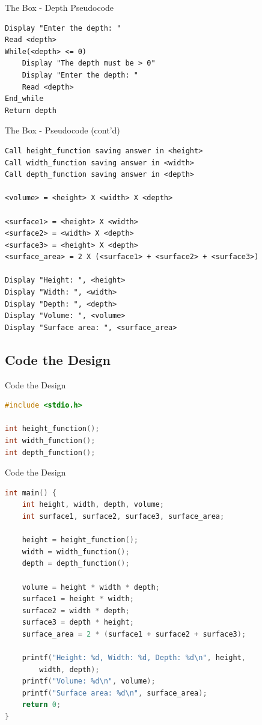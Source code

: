 \documentclass[graphics]{beamer}
\begin{document}
\begin{frame}[fragile]{The Box - Depth Pseudocode}
    \begin{verbatim}
Display "Enter the depth: "
Read <depth>
While(<depth> <= 0)
    Display "The depth must be > 0"
    Display "Enter the depth: "
    Read <depth>
End_while
Return depth
    \end{verbatim}
\end{frame}

\begin{frame}[fragile]{The Box - Pseudocode (cont'd)}
    \begin{verbatim}
Call height_function saving answer in <height>
Call width_function saving answer in <width>
Call depth_function saving answer in <depth>

<volume> = <height> X <width> X <depth>

<surface1> = <height> X <width>
<surface2> = <width> X <depth>
<surface3> = <height> X <depth>
<surface_area> = 2 X (<surface1> + <surface2> + <surface3>)

Display "Height: ", <height>
Display "Width: ", <width>
Display "Depth: ", <depth>
Display "Volume: ", <volume>
Display "Surface area: ", <surface_area>
    \end{verbatim}
\end{frame}

\subsection{Code the Design}
\begin{frame}[fragile]{Code the Design}
    \begin{lstlisting}[language=C,basicstyle=\footnotesize,keywordstyle=\color{blue},commentstyle=\color{green},showstringspaces=false,stringstyle=\color{red}]
#include <stdio.h>

int height_function();
int width_function();
int depth_function();
    \end{lstlisting}
\end{frame}

\begin{frame}[fragile]{Code the Design}
    \begin{lstlisting}[language=C,basicstyle=\footnotesize,keywordstyle=\color{blue},commentstyle=\color{green},showstringspaces=false,stringstyle=\color{red}]
int main() {
    int height, width, depth, volume;
    int surface1, surface2, surface3, surface_area;
    
    height = height_function();
    width = width_function();
    depth = depth_function();
    
    volume = height * width * depth;
    surface1 = height * width;
    surface2 = width * depth;
    surface3 = depth * height;
    surface_area = 2 * (surface1 + surface2 + surface3);
    
    printf("Height: %d, Width: %d, Depth: %d\n", height,
        width, depth);
    printf("Volume: %d\n", volume);
    printf("Surface area: %d\n", surface_area);
    return 0;
}
    \end{lstlisting}
\end{frame}
\end{document}
